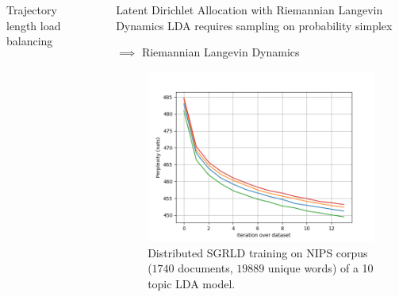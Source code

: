\documentclass[final]{beamer}
\newlength{\sepwid}
\newlength{\onecolwid}
\newlength{\twocolwid}
\begin{document}
\begin{frame}[t]
\begin{columns}[t]
\begin{column}{\twocolwid}
\begin{columns}[t,totalwidth=\twocolwid]
\begin{column}{\onecolwid}
\begin{block}{Trajectory length load balancing}

\end{block}



\end{column} %

\end{columns} %


\end{column} %

\begin{column}{\sepwid}\end{column} %

\begin{column}{\onecolwid} %

  \begin{block}{Latent Dirichlet Allocation with Riemannian Langevin Dynamics}
    LDA requires sampling on probability simplex

    $\implies$ Riemannian Langevin Dynamics
    \cite{patterson2013stochastic}
  \begin{figure}
    \centering
    \includegraphics[width=0.8\linewidth]{poster-figures/perplexity-lda.png}
    \caption{Distributed SGRLD training on NIPS corpus ($1740$ documents,
      $19889$ unique words) of a 10 topic LDA model.}
    \label{fig:perplexity-sgrld}
  \end{figure}
\end{block}


\end{column}
\end{columns}
\end{frame}
\end{document}
